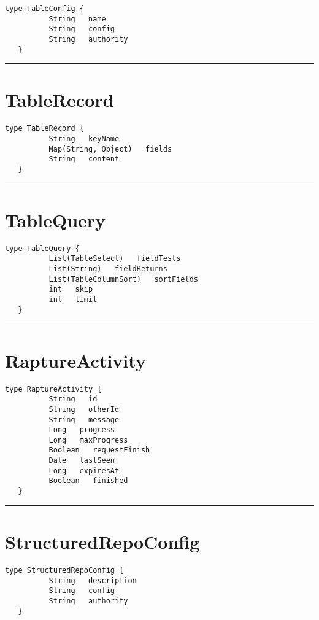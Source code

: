 \begin{lstlisting}[style=nonumbers]
   type TableConfig {
          String   name
          String   config
          String   authority
   }
\end{lstlisting}

\rule{12cm}{2pt}
\section{TableRecord}
\label{type:TableRecord}

\begin{lstlisting}[style=nonumbers]
   type TableRecord {
          String   keyName
          Map(String, Object)   fields
          String   content
   }
\end{lstlisting}

\rule{12cm}{2pt}
\section{TableQuery}
\label{type:TableQuery}

\begin{lstlisting}[style=nonumbers]
   type TableQuery {
          List(TableSelect)   fieldTests
          List(String)   fieldReturns
          List(TableColumnSort)   sortFields
          int   skip
          int   limit
   }
\end{lstlisting}

\rule{12cm}{2pt}
\section{RaptureActivity}
\label{type:RaptureActivity}

\begin{lstlisting}[style=nonumbers]
   type RaptureActivity {
          String   id
          String   otherId
          String   message
          Long   progress
          Long   maxProgress
          Boolean   requestFinish
          Date   lastSeen
          Long   expiresAt
          Boolean   finished
   }
\end{lstlisting}

\rule{12cm}{2pt}
\section{StructuredRepoConfig}
\label{type:StructuredRepoConfig}

\begin{lstlisting}[style=nonumbers]
   type StructuredRepoConfig {
          String   description
          String   config
          String   authority
   }
\end{lstlisting}

